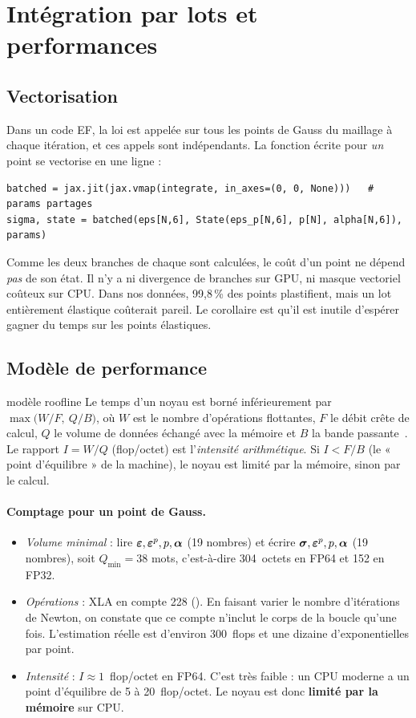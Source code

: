 \section{Intégration par lots et performances}\label{sec:perf}

\subsection{Vectorisation}

Dans un code EF, la loi est appelée sur tous les points de Gauss du maillage à chaque itération, et ces appels sont indépendants. La fonction écrite pour \emph{un} point se vectorise en une ligne :
\begin{lstlisting}
batched = jax.jit(jax.vmap(integrate, in_axes=(0, 0, None)))   # params partages
sigma, state = batched(eps[N,6], State(eps_p[N,6], p[N], alpha[N,6]), params)
\end{lstlisting}
Comme les deux branches de chaque  sont calculées, le coût d'un point ne dépend \emph{pas} de son état. Il n'y a ni divergence de branches sur GPU, ni masque vectoriel coûteux sur CPU. Dans nos données, 99,8\,\% des points plastifient, mais un lot entièrement élastique coûterait pareil. Le corollaire est qu'il est inutile d'espérer gagner du temps sur les points élastiques.

\subsection{Modèle de performance}

\begin{rappel}{modèle roofline}
Le temps d'un noyau est borné inférieurement par $\max\big(W/F,\ Q/B\big)$, où $W$ est le nombre d'opérations flottantes, $F$ le débit crête de calcul, $Q$ le volume de données échangé avec la mémoire et $B$ la bande passante~\cite{williams2009}. Le rapport $I=W/Q$ (flop/octet) est l'\emph{intensité arithmétique}. Si $I<F/B$ (le « point d'équilibre » de la machine), le noyau est limité par la mémoire, sinon par le calcul.
\end{rappel}

\paragraph{Comptage pour un point de Gauss.}
\begin{itemize}[nosep]
  \item \emph{Volume minimal} : lire $\boldsymbol{\varepsilon},\boldsymbol{\varepsilon}^{p},p,\boldsymbol{\alpha}$ (19 nombres) et écrire $\boldsymbol{\sigma},\boldsymbol{\varepsilon}^{p},p,\boldsymbol{\alpha}$ (19 nombres), soit $Q_{\min}=38$ mots, c'est-à-dire 304~octets en FP64 et 152 en FP32.
  \item \emph{Opérations} : XLA en compte 228 (). En faisant varier le nombre d'itérations de Newton, on constate que ce compte n'inclut le corps de la boucle qu'une fois. L'estimation réelle est d'environ 300~flops et une dizaine d'exponentielles par point.
  \item \emph{Intensité} : $I\approx1$~flop/octet en FP64. C'est très faible : un CPU moderne a un point d'équilibre de 5 à 20~flop/octet. Le noyau est donc \textbf{limité par la mémoire} sur CPU.
\end{itemize}

